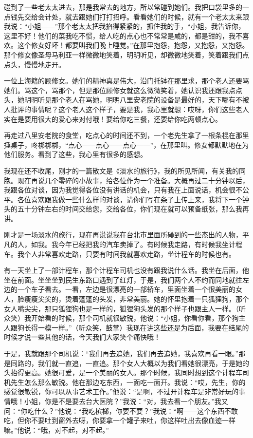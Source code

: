 \par 碰到了一些老太太进去，那是我常去的地方，所以常碰到她们。我把口袋里多的一点钱先交给会计处，就去跟她们打打招呼。看看她们的时候，就有一个老太太来跟我说：“小姐——”那个老太太把我掐得紧紧的，抓住我的手，“小姐，我告诉你，这里不好！他们的菜我吃不惯，给人吃的点心也不常常是咸的，都是甜的，我不喜欢。这个修女好坏！都要叫我们晚上睡觉。”在那里抱怨，抱怨，又抱怨，又抱怨。那个修女像圣母马利亚一样微微地笑着，明明听见，却微微地笑着，笑着跟我们点点头，慢慢地走开。
\par 一位上海籍的顾修女。她们的精神真是伟大，沿门托钵在那里求，那个老人还要骂她们。骂这个，骂那个，但是那位顾修女就这么微微笑着，她认识我还跟我点点头，她明明听见那个老人在骂她，明明八里安老院的设备是最好的，天下哪有不被人批评的事情呢？这个老人这个样子，要是我，我心里就想：哎呀，你们这些老人实在是要用很大的爱心来对付哦！要给你吃三餐，还要给你吃两顿点心。
\par 再走过八里安老院的食堂，吃点心的时间还不到，一个老先生拿了一根条棍在那里捶桌子，咚梆梆梆，“点心——点心——点心——”，在那里叫。修女都默默地在为他们服务。看到了这些，我心里有很多的感想。
\par 我现在还不收尾，刚才的一篇散文是《淡水的旅行》，我的所见所闻，有关我的同胞。现在再说几个零碎的小故事，给各位作为一个准备。大概再过二十分钟以后，我跟各位对谈，因为我觉得各位没有讲话的机会，只有我在上面说话，机会很不公平。各位喜欢跟我做一些什么样的对谈，请你们写在条子上传上来，我将下一个钟头的五十分钟左右的时间交给您，交给各位，你们现在就可以预备纸张，那么我再讲。
\par 刚才是一场淡水的旅行，现在再说说我在台北市里面所碰到的一些杰出的人物，平凡的人，如我。我今年已经把我的汽车卖掉了。有时候我走路，有时候我坐计程车。我个人非常喜欢走路，只要有时间我就喜欢走路，坐计程车的时候也有。
\par 有一天坐上了一部计程车，那个计程车司机也没有跟我说什么话。我坐在后面，他坐在前面。坐坐坐到民生东路口遇到了红灯，于是，我们两个人不约而同地就往左边的一个车子看去。一看，左边是很漂亮的一部轿车，里面坐着一个很美丽的女人，脸瘦瘦尖尖的，烫着蓬蓬的头发，非常美丽。她的怀里抱着一只狐狸狗，那个女人嘴尖尖，那只狐狸狗也是一样的，狐狸狗头发的那个样子也跟主人一样。（听众笑）我开始看的时候，那个司机就很敏锐，他说：“小姐，你看你看，那个狗主人跟狗长得一模一样。”（听众笑，鼓掌）我现在讲这些还是为后面，我要在结尾的时候才说一些其他的话，今天我们大家笑个痛快哦！
\par 于是，我就跟那个司机说：“我们再去追她，我们再去追她，我喜欢再看一眼。”那是同路的，我们就一直追，一直追。那个女人大概以为我们看她很漂亮，于是她的头抬得更高。她很可爱，是一个美丽的女人。那个时候，我同时想到这个计程车司机先生怎么那么敏锐。他在那边吃东西，一面吃一面开。我说：“哎，先生，你的感觉很敏锐，你可以从事艺术工作。”他说：“是啊，不过开计程车是非常好玩的事情哦！小姐，你是不是要去台大医院？”我说：“对，我去看一个朋友。”我又问：“你吃什么？”他说：“我吃槟榔，你要不要？”我说：“啊——这个东西不敢吃，但你不要吐到窗外去呀，你要拿一个罐子来吐，你这样吐出去像血迹一样嘛。”他说：“哦，对不起，对不起。”

